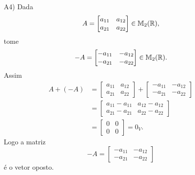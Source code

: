 \documentclass[12pt]{exam}
\begin{document}
\begin{itemize}
        \item[A4)] Dada
        \[
        A = \begin{bmatrix} a_{11} & a_{12}\\a_{21} & a_{22}\end{bmatrix} \in \mathbb{M}_{2}(\mathbb{R}),
        \]
        tome
        \[
        -A = \begin{bmatrix} -a_{11} & -a_{12}\\-a_{21} & -a_{22}\end{bmatrix} \in \mathbb{M}_{2}(\mathbb{R}).
        \]
        Assim
        \begin{align*}
            A + (-A) & = \begin{bmatrix} a_{11} & a_{12}\\a_{21} & a_{22}\end{bmatrix} +
            \begin{bmatrix} -a_{11} & -a_{12}\\-a_{21} & -a_{22}\end{bmatrix}
            \\ &= \begin{bmatrix} a_{11} - a_{11} & a_{12} - a_{12}\\a_{21} - a_{21} & a_{22} - a_{22}\end{bmatrix}
            \\ &= \begin{bmatrix}0 & 0\\0 & 0\end{bmatrix} = 0_V.
        \end{align*}
        Logo a matriz
        \[
        -A = \begin{bmatrix} -a_{11} & -a_{12}\\-a_{21} & -a_{22}\end{bmatrix}
        \]
        é o vetor oposto.


\end{itemize}
\end{document}
